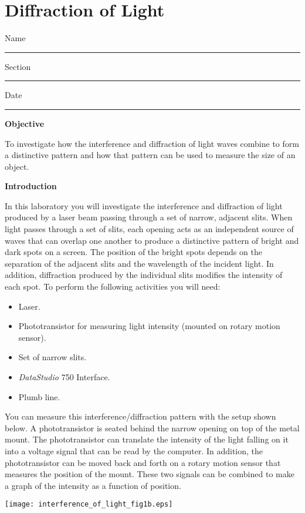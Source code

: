 
\section{Diffraction of Light}

Name \rule{2.0in}{0.1pt}\hfill{}Section \rule{1.0in}{0.1pt}\hfill{}Date
\rule{1.0in}{0.1pt}

\textbf{Objective}

To investigate how the interference and diffraction of light waves
combine to form a distinctive pattern and how that pattern can be
used to measure the size of an object.

\textbf{Introduction}

In this laboratory you will investigate the interference and diffraction
of light produced by a laser beam passing through a set of narrow,
adjacent slits. When light passes through a set of slits, each opening
acts as an independent source of waves that can overlap one another
to produce a distinctive pattern of bright and dark spots on a screen.
The position of the bright spots depends on the separation of the
adjacent slits and the wavelength of the incident light. In addition,
diffraction produced by the individual slits modifies the intensity
of each spot. To perform the following activities you will need:

\begin{itemize}
\item Laser.
\item Phototransistor for measuring light intensity (mounted on rotary motion sensor).
\item Set of narrow slits.
\item {\it DataStudio} 750 Interface.
\item Plumb line.
\end{itemize}
You can measure this interference/diffraction pattern with the setup
shown below. A phototransistor is seated behind the narrow opening on top
of the metal mount. The phototransistor can translate the intensity
of the light falling on it into a voltage signal that can be read
by the computer. In addition, the phototransistor can be moved back and
forth on a rotary motion sensor that measures the position of the 
mount.
These two signals can be combined to
make a graph of the intensity as a function of position.

\vspace{0.3cm}
\begin{center}
\texttt{[image: interference\_of\_light\_fig1b.eps]}
\end{center}
\vspace{0.3cm}

